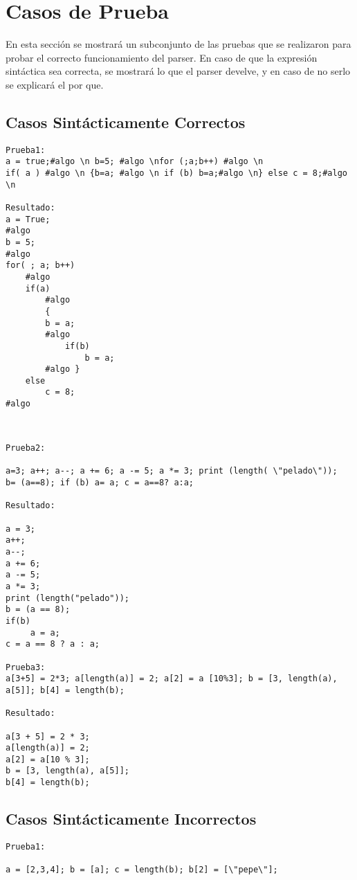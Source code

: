 \section{Casos de Prueba}

En esta sección se mostrará un subconjunto de las pruebas que se realizaron para probar el correcto funcionamiento del parser. En caso de que la expresión sintáctica sea correcta, se mostrará lo que el parser develve, y en caso de no serlo se explicará el por que.

\subsection{Casos Sintácticamente Correctos}

\begin{lstlisting}
Prueba1:
a = true;#algo \n b=5; #algo \nfor (;a;b++) #algo \n 
if( a ) #algo \n {b=a; #algo \n if (b) b=a;#algo \n} else c = 8;#algo \n

Resultado:
a = True;
#algo 
b = 5;
#algo 
for( ; a; b++)
	#algo 
	if(a)
		#algo 
		{
		b = a;
		#algo 
			if(b)
				b = a;
		#algo }
	else
		c = 8;
#algo 
\end{lstlisting}

\begin{verbatim}


Prueba2:

a=3; a++; a--; a += 6; a -= 5; a *= 3; print (length( \"pelado\"));
b= (a==8); if (b) a= a; c = a==8? a:a;

Resultado:

a = 3;
a++;
a--;
a += 6;
a -= 5;
a *= 3;
print (length("pelado"));
b = (a == 8);
if(b)
     a = a;
c = a == 8 ? a : a;

Prueba3:
a[3+5] = 2*3; a[length(a)] = 2; a[2] = a [10%3]; b = [3, length(a), a[5]]; b[4] = length(b);

Resultado:

a[3 + 5] = 2 * 3;
a[length(a)] = 2;
a[2] = a[10 % 3];
b = [3, length(a), a[5]];
b[4] = length(b);

\end{verbatim}



\subsection{Casos Sintácticamente Incorrectos}

\begin{verbatim}
Prueba1:

a = [2,3,4]; b = [a]; c = length(b); b[2] = [\"pepe\"];

\end{verbatim}


